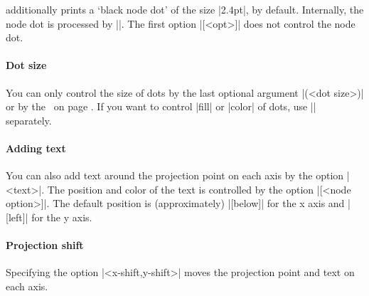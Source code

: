 \icmd{\tzproj*} additionally prints a `black node dot' of the size |2.4pt|, by default.
Internally, the node dot is processed by |\tzdot*|.
The first option |[<opt>]| does not control the node dot.

\paragraph{Dot size}
You can only control the size of dots by the last optional argument |(<dot size>)| or by the \threeways\ on page \pageref{ss:threeways}.
If you want to control |fill| or |color| of dots, use |\tzdot*| separately.

\begin{tzcode}{.3}
\end{tzcode}

\paragraph{Adding text}
You can also add text around the projection point on each axis by the option |{<text>}|.
The position and color of the text is controlled by the option |[<node option>]|.
The default position is (approximately) |[below]| for the x axis and |[left]| for the y axis.


\begin{tzcode}{.3}
\end{tzcode}

\paragraph{Projection shift}
Specifying the option |<x-shift,y-shift>| moves the projection point and text on each axis.

\begin{tzcode}{.3}
\end{tzcode}



